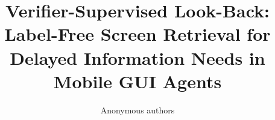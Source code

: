 \documentclass[10pt]{article}
\title{Verifier-Supervised Look-Back: Label-Free Screen Retrieval for Delayed Information Needs in Mobile GUI Agents}
\author{Anonymous authors}
\date{}
\begin{document}
\maketitle

\begin{abstract}

\end{abstract}









{\footnotesize

}
\end{document}

